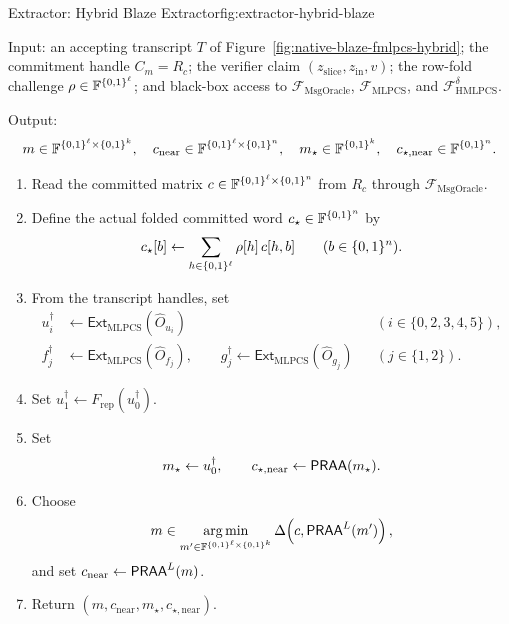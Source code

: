 \begin{protocolbox}{Extractor: Hybrid Blaze Extractor}{fig:extractor-hybrid-blaze}
\small\raggedright
\noindent Input: an accepting transcript \(T\) of
Figure~\ref{fig:native-blaze-fmlpcs-hybrid}; the commitment handle
\(C_m=R_c\); the verifier claim
\((z_{\mathrm{slice}},z_{\mathrm{in}},v)\); the row-fold challenge
\(\rho\in\mathbb{F}^{\{0,1\}^\ell}\); and black-box access to
\(\mathcal F_{\mathrm{MsgOracle}}\), \(\mathcal F_{\mathrm{MLPCS}}\), and
\(\mathcal F_{\mathrm{HMLPCS}}^\delta\).

\smallskip
\noindent Output:
\[
  m\in\mathbb{F}^{\{0,1\}^\ell\times\{0,1\}^k},\quad
  c_{\mathrm{near}}\in\mathbb{F}^{\{0,1\}^\ell\times\{0,1\}^n},\quad
  m_\star\in\mathbb{F}^{\{0,1\}^k},\quad
  c_{\star,\mathrm{near}}\in\mathbb{F}^{\{0,1\}^n}.
\]

\begin{enumerate}[leftmargin=0.24in,label=\textbf{E\arabic*.},itemsep=0.08em,topsep=0.1em,parsep=0pt]
  \item Read the committed matrix \(c\in\mathbb{F}^{\{0,1\}^\ell\times\{0,1\}^n}\) from
        \(R_c\) through \(\mathcal F_{\mathrm{MsgOracle}}\).
  \item Define the actual folded committed word
        \(c_\star\in\mathbb{F}^{\{0,1\}^n}\) by
        \[
          c_\star[b]\gets
          \sum_{h\in\{0,1\}^\ell}\rho[h]\,c[h,b]
          \qquad(b\in\{0,1\}^n).
        \]
  \item From the transcript handles, set
        \[
        \begin{aligned}
        u_i^\dagger&\gets
        \mathsf{Ext}_{\mathrm{MLPCS}}(\widehat O_{u_i})
        &&(i\in\{0,2,3,4,5\}),\\
        f_j^\dagger&\gets
        \mathsf{Ext}_{\mathrm{MLPCS}}(\widehat O_{f_j}),
        \qquad
        g_j^\dagger\gets
        \mathsf{Ext}_{\mathrm{MLPCS}}(\widehat O_{g_j})
        &&(j\in\{1,2\}).
        \end{aligned}
        \]
  \item Set \(u_1^\dagger\gets F_{\mathrm{rep}}(u_0^\dagger)\).
  \item Set
        \[
          m_\star\gets u_0^\dagger,
          \qquad
          c_{\star,\mathrm{near}}\gets\mathsf{PRAA}(m_\star).
        \]
  \item Choose
        \[
          m\in
          \operatorname*{arg\,min}_{m'\in\mathbb{F}^{\{0,1\}^\ell\times\{0,1\}^k}}
          \Delta\!\left(c,\mathsf{PRAA}^L(m')\right),
        \]
        and set \(c_{\mathrm{near}}\gets\mathsf{PRAA}^L(m)\).
  \item Return
        \((m,c_{\mathrm{near}},m_\star,c_{\star,\mathrm{near}})\).
\end{enumerate}
\end{protocolbox}

